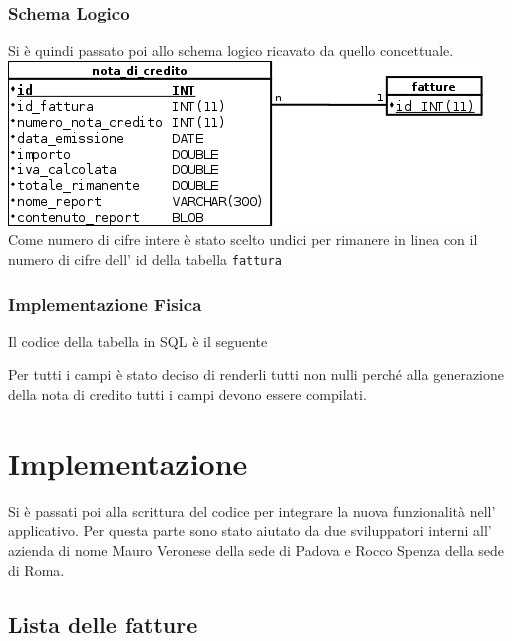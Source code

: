 \documentclass[12pt]{book}
\begin{document}
\subsection{Schema Logico}
Si è quindi passato poi allo schema logico ricavato da quello concettuale.
\newline
\newline
\includegraphics[scale=0.5]{img/schema_logico}
\newline
Come numero di cifre intere è stato scelto undici per rimanere in linea con il
numero di cifre dell' id della tabella \texttt{fattura}
\subsection{Implementazione Fisica}
Il codice della tabella in SQL è il seguente

Per tutti i campi è stato deciso di renderli tutti non nulli perché alla
generazione della nota di credito tutti i campi devono essere compilati.
\chapter{Implementazione}
Si è passati poi alla scrittura del codice per integrare la nuova funzionalità
nell' applicativo.
Per questa parte sono stato aiutato da due sviluppatori interni all' azienda
di nome Mauro Veronese della sede di Padova e Rocco Spenza della sede di Roma.
\section{Lista delle fatture}
\end{document}
